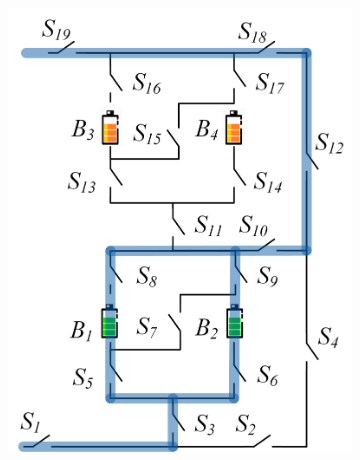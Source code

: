 \documentclass{article}
\begin{document}
\begin{figure}[htbp]
\begin{subfigure}[b]{0.31\textwidth}
        \includegraphics[width=\textwidth]{e2f2-isolate-2b.png}
        \caption{}
        \label{fig:my-isolated-2b}
    \end{subfigure}
    \\
    \begin{subfigure}[b]{0.31\textwidth}

\end{subfigure}
\end{figure}
\end{document}

